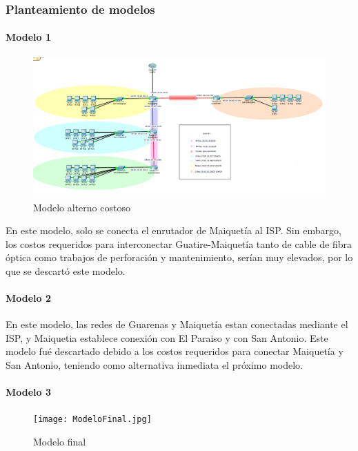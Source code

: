 \subsubsection{Planteamiento de modelos}\label{planteamiento-de-modelos}

\paragraph{Modelo 1}\label{modelo-1}

\begin{figure}[htbp]
\centering
\includegraphics{ModeloAlternoCostosos.png}
\caption{Modelo alterno costoso}
\end{figure}

En este modelo, solo se conecta el enrutador de Maiquetía al ISP. Sin
embargo, los costos requeridos para interconectar Guatire-Maiquetía
tanto de cable de fibra óptica como trabajos de perforación y
mantenimiento, serían muy elevados, por lo que se descartó este modelo.

\paragraph{Modelo 2}\label{modelo-2}

En este modelo, las redes de Guarenas y Maiquetía estan conectadas
mediante el ISP, y Maiquetia establece conexión con El Paraiso y con San
Antonio. Este modelo fué descartado debido a los costos requeridos para
conectar Maiquetía y San Antonio, teniendo como alternativa inmediata el
próximo modelo.

\paragraph{Modelo 3}\label{modelo-3}

\begin{figure}[htbp]
\centering
\texttt{[image: ModeloFinal.jpg]}
\caption{Modelo final}
\end{figure}

